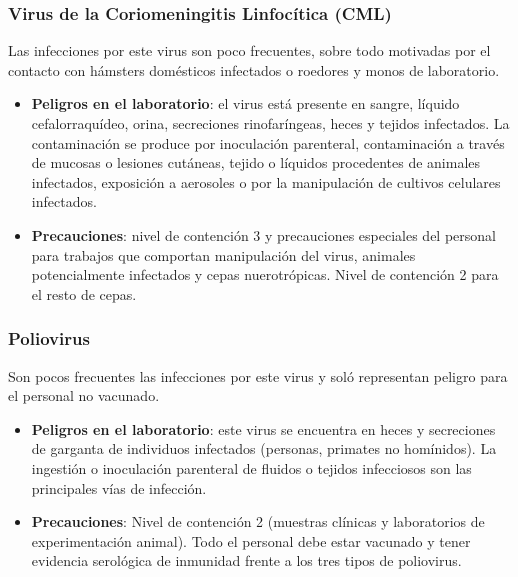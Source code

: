 \subsubsection{Virus de la Coriomeningitis Linfocítica (CML)}
Las infecciones por este virus son poco frecuentes, sobre todo motivadas por el contacto con hámsters domésticos infectados o roedores y monos de laboratorio.
\begin{itemize}[itemsep=0pt,parsep=0pt,topsep=0pt,partopsep=0pt]
    \item \textbf{Peligros en el laboratorio}: el virus está presente en sangre, líquido cefalorraquídeo, orina, secreciones rinofaríngeas, heces y tejidos infectados. La contaminación se produce por inoculación parenteral, contaminación a través de mucosas o lesiones cutáneas, tejido o líquidos procedentes de animales infectados, exposición a aerosoles o por la manipulación de cultivos celulares infectados.
    \item \textbf{Precauciones}: nivel de contención 3 y precauciones especiales del personal para trabajos que comportan manipulación del virus, animales potencialmente infectados y cepas nuerotrópicas. Nivel de contención 2 para el resto de cepas.
\end{itemize}
\subsubsection{Poliovirus}
Son pocos frecuentes las infecciones por este virus y soló representan peligro para el personal no vacunado.
\begin{itemize}[itemsep=0pt,parsep=0pt,topsep=0pt,partopsep=0pt]
    \item \textbf{Peligros en el laboratorio}: este virus se encuentra en heces y secreciones de garganta de individuos infectados (personas, primates no homínidos). La ingestión o inoculación parenteral de fluidos o tejidos infecciosos son las principales vías de infección.
    \item \textbf{Precauciones}:  Nivel de contención 2 (muestras clínicas y laboratorios de experimentación animal). Todo el personal debe estar vacunado y tener evidencia serológica de inmunidad frente a los tres tipos de poliovirus.
\end{itemize}
